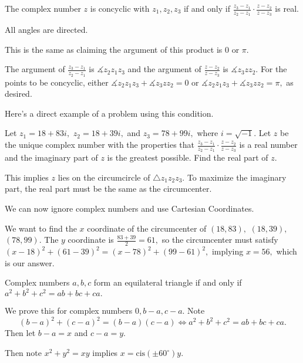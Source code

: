 \documentclass{article}
\begin{document}
\begin{theo}
The complex number $z$ is concyclic with $z_1,z_2,z_3$ if and only if $\frac{z_3-z_1}{z_2-z_1}\cdot\frac{z-z_2}{z-z_3}$ is real.
\end{theo}

\begin{pro}
All angles are directed.

This is the same as claiming the argument of this product is $0$ or $\pi.$ 

The argument of $\frac{z_3-z_1}{z_2-z_1}$ is $\measuredangle z_2z_1z_3$ and the argument of $\frac{z-z_2}{z-z_3}$ is $\measuredangle z_3zz_2.$ For the points to be concyclic, either $\measuredangle z_2z_1z_3+\measuredangle z_3zz_2=0$ or $\measuredangle z_2z_1z_3+\measuredangle z_3zz_2=\pi,$ as desired.
\end{pro}

Here's a direct example of a problem using this condition.

\begin{exam}[AIME I 2017/10]
Let $z_1=18+83i,$ $z_2=18+39i,$ and $z_3=78+99i,$ where $i=\sqrt{-1}.$ Let $z$ be the unique complex number with the properties that $\frac{z_3-z_1}{z_2-z_1}\cdot\frac{z-z_2}{z-z_3}$ is a real number and the imaginary part of $z$ is the greatest possible. Find the real part of $z$.
\end{exam}

\begin{sol}
This implies $z$ lies on the circumcircle of $\triangle z_1z_2z_3.$ To maximize the imaginary part, the real part must be the same as the circumcenter.

We can now ignore complex numbers and use Cartesian Coordinates.

We want to find the $x$ coordinate of the circumcenter of $(18, 83),$ $(18, 39),$ $(78, 99).$ The $y$ coordinate is $\frac{83+39}{2}=61,$ so the circumcenter must satisfy $(x-18)^2+(61-39)^2=(x-78)^2+(99-61)^2,$ implying $x=56,$ which is our answer.
\end{sol}

\begin{theo}
Complex numbers $a,b,c$ form an equilateral triangle if and only if $a^2+b^2+c^2=ab+bc+ca.$
\end{theo}

\begin{pro}
We prove this for complex numbers $0,b-a,c-a.$ Note 
\[(b-a)^2+(c-a)^2=(b-a)(c-a)\Leftrightarrow a^2+b^2+c^2=ab+bc+ca.\]
Then let $b-a=x$ and $c-a=y.$

Then note $x^2+y^2=xy$ implies $x=\text{cis}(\pm 60^{\circ})y.$
\end{pro}
\end{document}
